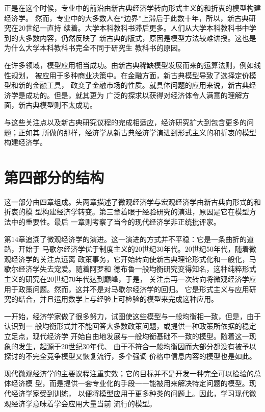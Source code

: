 正是在这个时候，专业中的前沿由新古典经济学转向形式主义的和折衷的模型构建经济学。
然而，专业中的大多数人在“边界”上滞后于此数十年，所以，新古典研究在20世纪一直持
续着。大学本科教科书滞后更多。人们从大学本科教科书中学到的大多数内容，仍然反映了
新古典的版式，原因是模型方法较难讲授。这也是为什么大学本科教科书完全不同于研究生
教科书的原因。

在许多领域，模型应用相当成功。由新古典稀缺模型发展而来的运算法则，例如线性规划，
被应用于多种商业决策中。在金融方面，新古典模型导致了选择定价模型和新的金融工具，
政变了金融市场的性质。就具体问题的应用来说，新古典经济学是成功的。但是，就其更为
广泛的探求以获得对经济体令人满意的理解方面，新古典模型则不太成功。

与这些关注点以及新古典研究议程的完成相适应，经济研究扩大到包含更多的问题；正如其
所做的那样，经济学从新古典经济学演进到形式主义的和折衷的模型构建经济学。

\section*{第四部分的结构}

这一部分由四章组成。头两章描述了微观经济学与宏观经济学由新古典向形式的和折衷的模
型构建经济学转变。第三章着眼于经验研究的演进，原因是它在模型方法中的重要性。最后
一章则考察了当今的现代经济学非正统批评家。

第14章追溯了微观经济学的演进。这一演进的方式并不平稳：它是一条曲折的道路，开始于
马歌尔经济学优于制度主义的20世纪30年代。20世纪50年代，随着微观经济学的关注点远离
政策事务，它开始转向使新古典理论形式化和一般化，马歇尔经济学失去宠爱。随着阿罗和
德布鲁一般均衡研究变得知名，这种纯粹形式主义的研究在20世纪70年代达到巅峰，于是，
关注点再一次转向将微观经济学应用于政策问题。然而，这并不是对马歇尔经济学的回归。
它是形式主义与应用研究的结合，并且运用数学上与经验上可检验的模型来完成这种应用。

一开始，经济学家做了很多努力，试图使这些模型与一般均衡相一致，但是，由于认识到一
般均衡形式并不能回答大多数政策问题，或提供一种政策所依据的稳定立足点，现代经济学
开始自由地发展与一般均衡基础不一致的模型。随着这一现象的发生，起源于20世纪30年代、
由于不符合一般均衡因而大部分都没有被予以探讨的不完全竞争模型又恢复流行，多个强调
价格中信息内容的模型也是如此。

现代微观经济学的主要议程注重实效；它的目标并不是开发一种完全可以检验的总体经济模
型，而是提供一套专业化的手段一一能被用来解决特定问题的模型。现代经济学家受到训练，
以便将模型应用于更多种类的问题上。因此，学习现代微观经济学意味着学会应用大量当前
流行的模型。


